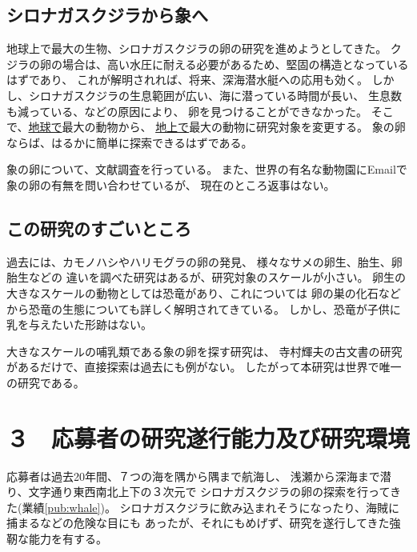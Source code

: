 \documentclass[11pt,a4j,dvipdfmx]{jarticle} 					%
\newcommand{\研究課題名}{象の卵}
\newcommand{\研究機関名}{逢坂大学}
\newcommand{\研究代表者氏名}{湯川秀樹}
\newcommand{\研究期間の最終元号年度}{6}  %
\begin{document}
\subsection{シロナガスクジラから象へ}
\label{sec:whale}
地球上で最大の生物、シロナガスクジラの卵の研究を進めようとしてきた。
クジラの卵の場合は、高い水圧に耐える必要があるため、堅固の構造となっているはずであり、
これが解明されれば、将来、深海潜水艇への応用も効く。
しかし、シロナガスクジラの生息範囲が広い、海に潜っている時間が長い、
生息数も減っている、などの原因により、
卵を見つけることができなかった。
そこで、\underline{地球で}最大の動物から、
\underline{地上で}最大の動物に研究対象を変更する。
象の卵ならば、はるかに簡単に探索できるはずである。

	象の卵について、文献調査を行っている。
	また、世界の有名な動物園にEmailで象の卵の有無を問い合わせているが、
	現在のところ返事はない。

\subsection{この研究のすごいところ}
	過去には、カモノハシやハリモグラの卵の発見、
	様々なサメの卵生、胎生、卵胎生などの
	違いを調べた研究はあるが、研究対象のスケールが小さい。
	卵生の大きなスケールの動物としては恐竜があり、これについては
	卵の巣の化石などから恐竜の生態についても詳しく解明されてきている。
	しかし、恐竜が子供に乳を与えたいた形跡はない。
	
	大きなスケールの哺乳類である象の卵を探す研究は、
	寺村輝夫の古文書の研究があるだけで、直接探索は過去にも例がない。
	したがって本研究は世界で唯一の研究である。




\section{３　応募者の研究遂行能力及び研究環境}

\PapersInstructions	%

	応募者は過去20年間、７つの海を隅から隅まで航海し、
	浅瀬から深海まで潜り、文字通り東西南北上下の３次元で
	シロナガスクジラの卵の探索を行ってきた(業績\ref{pub:whale})。		%
	シロナガスクジラに飲み込まれそうになったり、海賊に捕まるなどの危険な目にも
	あったが、それにもめげず、研究を遂行してきた強靭な能力を有する。
\end{document}
